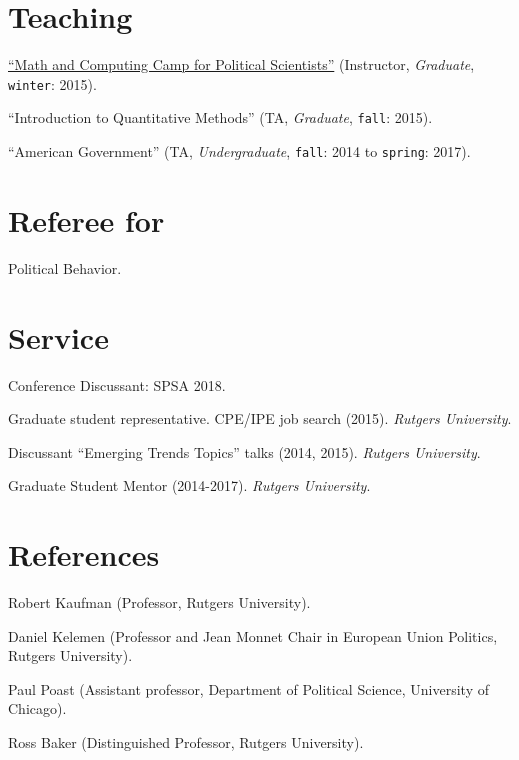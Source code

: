 \documentclass[letterpaper]{article}
\renewenvironment{itemize}{
  \begin{list}{}{
    \setlength{\leftmargin}{1.5em}
  }
}{
  \end{list}
}
\begin{document}
\section*{Teaching}

\begin{itemize}
\item[$\bullet$] \href{http://github.com/hbahamonde/Math-Camp/raw/master/Syllabus/Math_Camp_Syllabus.pdf/}{``Math and Computing Camp for Political Scientists''} (Instructor, \emph{Graduate}, \texttt{winter}: 2015).
\item[$\bullet$] ``Introduction to Quantitative Methods'' (TA, \emph{Graduate}, \texttt{fall}: 2015).
\item[$\bullet$] ``American Government'' (TA, \emph{Undergraduate}, \texttt{fall}: 2014 to \texttt{spring}: 2017).
\end{itemize}


\section*{Referee for}
  \begin{itemize}
    \item[$\bullet$] Political Behavior.
  \end{itemize}

\section*{Service}

\begin{itemize}
\item[$\bullet$] Conference Discussant: SPSA 2018.
\item[$\bullet$] Graduate student representative. CPE/IPE job search (2015). \emph{Rutgers University}.
\item[$\bullet$] Discussant ``Emerging Trends Topics'' talks (2014, 2015). \emph{Rutgers University}.
\item[$\bullet$] Graduate Student Mentor (2014-2017). \emph{Rutgers University}.
\end{itemize}


\section*{References}
\begin{itemize}
\item[$\bullet$] Robert Kaufman {\scriptsize(Professor, Rutgers University).}
\item[$\bullet$] Daniel Kelemen {\scriptsize(Professor and Jean Monnet Chair in
European Union Politics, Rutgers University).}
\item[$\bullet$] Paul Poast {\scriptsize(Assistant professor, Department of Political Science, University of Chicago).}
\item[$\bullet$] Ross Baker {\scriptsize(Distinguished Professor, Rutgers University).}
\end{itemize}
\end{document}
